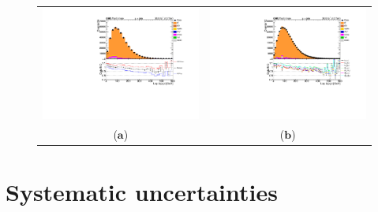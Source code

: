 \begin{figure}[htp]
\centering
\begin{tabular}{cc}
\hspace{-0.5cm}
\includegraphics[scale=0.45]{fig/correc_uncer/lep_topPT_pdf.pdf}
& \hspace{-1.50cm} \includegraphics[scale=0.45]{fig/correc_uncer/lep_top_ren_fac.pdf}\\
  \qquad ($\mathbf{a}$)\qquad\qquad&($\mathbf{b}$)\qquad\qquad\qquad\qquad \\
\end{tabular}
\caption{ }\label{fig:top_pt_correc_expec}
\end{figure}

\section{Systematic uncertainties}\label{sec:sys_unc}
